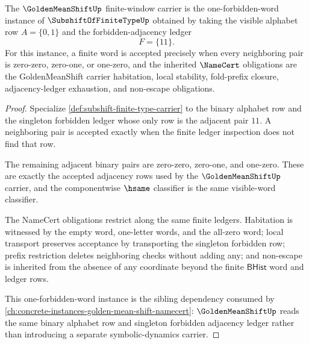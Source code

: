 \begin{theorem}
\label{thm:subshift-finite-type-golden-mean-instance}
The $\GoldenMeanShiftUp$ finite-window carrier is the one-forbidden-word instance of $\SubshiftOfFiniteTypeUp$ obtained by taking the visible alphabet row $A=\{0,1\}$ and the forbidden-adjacency ledger
$$
F=\{11\}.
$$
For this instance, a finite word is accepted precisely when every neighboring pair is zero-zero, zero-one, or one-zero, and the inherited $\NameCert$ obligations are the GoldenMeanShift carrier habitation, local stability, fold-prefix closure, adjacency-ledger exhaustion, and non-escape obligations.
\end{theorem}
\begin{proof}
Specialize \autoref{def:subshift-finite-type-carrier} to the binary alphabet row and the singleton forbidden ledger whose only row is the adjacent pair $11$. A neighboring pair is accepted exactly when the finite ledger inspection does not find that row.

The remaining adjacent binary pairs are zero-zero, zero-one, and one-zero. These are exactly the accepted adjacency rows used by the $\GoldenMeanShiftUp$ carrier, and the componentwise $\hsame$ classifier is the same visible-word classifier.

The NameCert obligations restrict along the same finite ledgers. Habitation is witnessed by the empty word, one-letter words, and the all-zero word; local transport preserves acceptance by transporting the singleton forbidden row; prefix restriction deletes neighboring checks without adding any; and non-escape is inherited from the absence of any coordinate beyond the finite $\mathsf{BHist}$ word and ledger rows.

This one-forbidden-word instance is the sibling dependency consumed by \autoref{ch:concrete-instances-golden-mean-shift-namecert}: $\GoldenMeanShiftUp$ reads the same binary alphabet row and singleton forbidden adjacency ledger rather than introducing a separate symbolic-dynamics carrier.
\end{proof}

